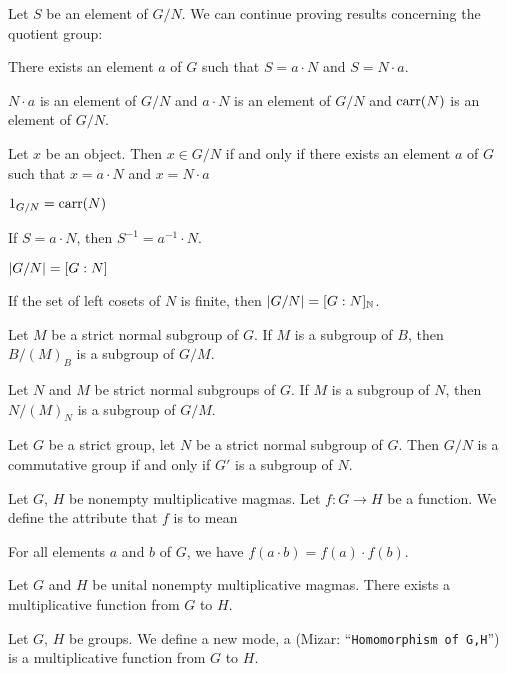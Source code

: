 \documentclass{article}
\begin{document}
Let $S$ be an element of $G/N$.
We can continue proving results concerning the quotient group:
\begin{thm}
\item\label{group6:21} There exists an element $a$ of $G$ such that
  $S=a\cdot N$ and $S=N\cdot a$.
\item\label{group6:22} $N\cdot a$ is an element of $G/N$ and $a\cdot N$
  is an element of $G/N$ and $\operatorname{carr}(N)$ is an element of $G/N$.
\item\label{group6:23} Let $x$ be an object.
  Then $x\in G/N$ if and only if there exists an element $a$ of $G$ such
  that $x=a\cdot N$ and $x=N\cdot a$
\item\label{group6:24} $1_{G/N} = \operatorname{carr}(N)$
\item\label{group6:25} If $S=a\cdot N$, then $S^{-1}=a^{-1}\cdot N$.
\item\label{group6:26} $|G/N|=[G : N]$
\item\label{group6:27} If the set of left cosets of $N$ is finite,
  then $|G/N|=[G : N]_{\mathbb{N}}$.
\item\label{group6:28} Let $M$ be a strict normal subgroup of $G$.
  If $M$ is a subgroup of $B$, then $B/(M)_{B}$ is a subgroup of $G/M$.
\item\label{group6:29} Let $N$ and $M$ be strict normal subgroups of $G$.
  If $M$ is a subgroup of $N$, then $N/(M)_{N}$ is a subgroup of $G/M$.
\item\label{group6:30} Let $G$ be a strict group, let $N$ be a strict
  normal subgroup of $G$. Then $G/N$ is a commutative group if and only
  if $G'$ is a subgroup of $N$.
\end{thm}

\begin{definition}
Let $G$, $H$ be nonempty multiplicative magmas.
Let $f\colon G\to H$ be a function.
We define the attribute that $f$ is  to mean
\begin{defn}
\item For all elements $a$ and $b$ of $G$, we have
  $f(a\cdot b) = f(a)\cdot f(b)$.
\end{defn}
\end{definition}

Let $G$ and $H$ be unital nonempty multiplicative magmas. There exists a
multiplicative function from $G$ to $H$.

\begin{definition}
Let $G$, $H$ be groups.
We define a new mode, a  (Mizar:
``\verb#Homomorphism of G,H#'') is a multiplicative function from $G$ to $H$.
\end{definition}
\end{document}
